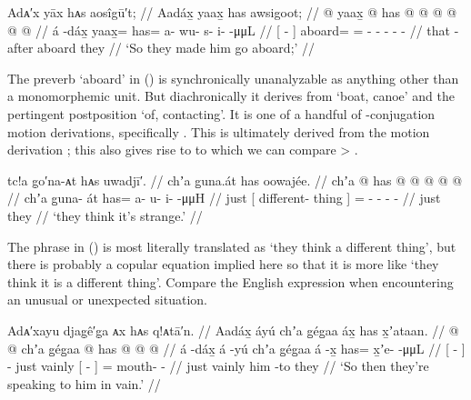 \ex\label{ex:106-7-put-aboard}%
%
\begingl
	\glpreamble	Adᴀ′x yāx hᴀs aosîgū′t; //
	\glpreamble	Aadáx̱ yaax̱ has awsigoot; //
	\gla	{}  @ {} {} yaax̱ @ has @  @ {} @ {} @ {} @ {} @ {} //
	\glb	{} á -dáx̱ {}
			yaax̱= has= a- wu- s- i-  -μμL //
	\glc	{}[  - {}]
			aboard= = - - - -  - //
	\gld	{} that -after {} aboard they  {} {} {} {} {} //
	\glft	‘So they made him go aboard;’
		//
\endgl
\xe

The preverb  ‘aboard’ in (\lastx) is synchronically unanalyzable as anything other than a monomorphemic unit.
But diachronically it derives from  ‘boat, canoe’ and the pertingent postposition  ‘of, contacting’.
It is one of a handful of -conjugation motion derivations, specifically .
This is ultimately derived from the motion derivation ; this also gives rise to  to which we can compare  > .

\ex\label{ex:106-8-strange}%
%
\begingl
	\glpreamble	tc!a g̣o′na-ᴀt hᴀs uwadjī′. //
	\glpreamble	chʼa g̱una.át has oowajée. //
	\gla	chʼa {}  @ {} {} has @  @ {} @ {} @ {} @ {} //
	\glb	chʼa {} g̱una- át {} has= a- u- i-  -μμH //
	\glc	just {}[ different- thing {}] = - - -  - //
	\gld	just {}  {} {} they  {} {} {} {} //
	\glft	‘they think it’s strange.’
		//
\endgl
\xe

The phrase in (\lastx) is most literally translated as ‘they think a different thing’, but there is probably a copular equation implied here so that it is more like ‘they think it is a different thing’.
Compare the English expression  when encountering an unusual or unexpected situation.

\ex\label{ex:106-9-speak-in-vain}%
%
\begingl
	\glpreamble	Adᴀ′xayu djag̣ê′g̣a ᴀx hᴀs q!ᴀtā′n. //
	\glpreamble	Aadáx̱ áyú chʼa g̱ég̱aa áx̱ has x̱ʼataan. //
	\gla	{}  @ {} {}  @ {} chʼa g̱ég̱aa {}  @ {} {} has @  @ {} @ {} //
	\glb	{} á -dáx̱ {} á -yú chʼa g̱ég̱aa {} á -x̱ {} has= x̱ʼe-  -μμL //
	\glc	{}[  - {}]  - just vainly {}[  - {}]
			= mouth-  - //
	\gld	{}  {} {}  {} just vainly {} him -to {} they  {} {} //
	\glft	‘So then they’re speaking to him in vain.’
		//
\endgl
\xe

